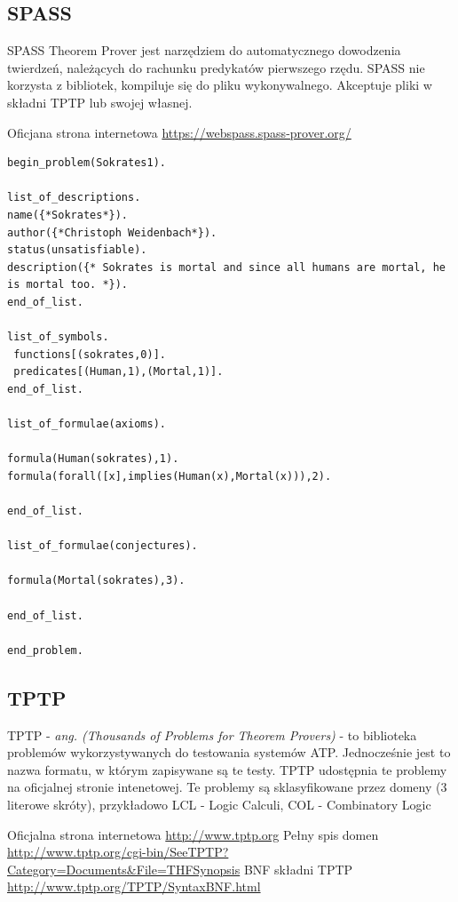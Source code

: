 \documentclass[a4paper,12pt]{article}
\begin{document}
\subsection{SPASS}

SPASS Theorem Prover jest narzędziem do automatycznego dowodzenia twierdzeń, należących do rachunku predykatów pierwszego rzędu.
\newline
SPASS nie korzysta z bibliotek, kompiluje się do pliku wykonywalnego.
Akceptuje pliki w składni TPTP lub swojej własnej.

Oficjana strona internetowa \url{https://webspass.spass-prover.org/}

\begin{lstlisting}[caption={Przykład pliku w składni SPASS}]
begin_problem(Sokrates1).

list_of_descriptions.
name({*Sokrates*}).
author({*Christoph Weidenbach*}).
status(unsatisfiable).
description({* Sokrates is mortal and since all humans are mortal, he is mortal too. *}).
end_of_list.

list_of_symbols.
 functions[(sokrates,0)].
 predicates[(Human,1),(Mortal,1)].
end_of_list.

list_of_formulae(axioms).

formula(Human(sokrates),1).
formula(forall([x],implies(Human(x),Mortal(x))),2).

end_of_list.

list_of_formulae(conjectures).

formula(Mortal(sokrates),3).

end_of_list.

end_problem.
\end{lstlisting}

\subsection{TPTP}

TPTP - \textit{ ang. (Thousands of Problems for Theorem Provers)} - to biblioteka problemów wykorzystywanych do testowania systemów ATP. Jednocześnie jest to nazwa formatu, w którym zapisywane są te testy. TPTP udostępnia te problemy na oficjalnej stronie intenetowej.
Te problemy są sklasyfikowane przez domeny (3 literowe skróty), przykładowo
LCL - Logic Calculi,
COL - Combinatory Logic

\noindent
Oficjalna strona internetowa \url{http://www.tptp.org}
\newline
Pełny spis domen \url{http://www.tptp.org/cgi-bin/SeeTPTP?Category=Documents&File=THFSynopsis}
\newline
BNF składni TPTP \url{http://www.tptp.org/TPTP/SyntaxBNF.html}
\end{document}
